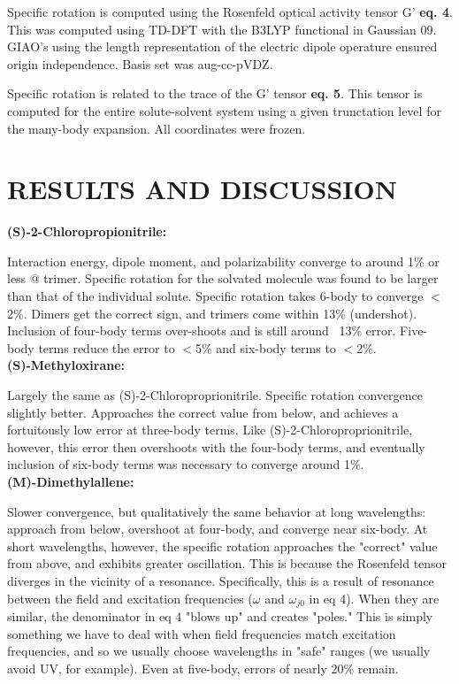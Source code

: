 \documentclass[12pt,a4paper]{article}
\begin{document}
	Specific rotation is computed using the Rosenfeld optical activity tensor G' \textbf{eq. 4}. This was computed using TD-DFT with the B3LYP functional in Gaussian 09. GIAO's using the length representation of the electric dipole operature ensured origin independence. Basis set was aug-cc-pVDZ.
	
	Specific rotation is related to the trace of the G' tensor \textbf{eq. 5}. This tensor is computed for the entire solute-solvent system using a given trunctation level for the many-body expansion. All coordinates were frozen.
	\section{RESULTS AND DISCUSSION}
	\noindent
	\textbf{(S)-2-Chloropropionitrile:} 
	
	Interaction energy, dipole moment, and polarizability converge to around 1\% or less @ trimer. Specific rotation for the solvated molecule was found to be larger than that of the individual solute. Specific rotation takes 6-body to converge $<$2\%. Dimers get the correct sign, and trimers come within 13\% (undershot). Inclusion of four-body terms over-shoots and is still around ~13\% error. Five-body terms reduce the error to $<$5\% and six-body terms to $<$2\%.\\

	\noindent
	\textbf{(S)-Methyloxirane:}
	
	Largely the same as (S)-2-Chloroproprionitrile. Specific rotation convergence slightly better. Approaches the correct value from below, and achieves a fortuitously low error at three-body terms. Like (S)-2-Chloroproprionitrile, however, this error then overshoots with the four-body terms, and eventually inclusion of six-body terms was necessary to converge around 1\%.\\
	
	\noindent
	\textbf{(M)-Dimethylallene:}
	
	Slower convergence, but qualitatively the same behavior at long wavelengths: approach from below, overshoot at four-body, and converge near six-body. At short wavelengths, however, the specific rotation approaches the "correct" value from above, and exhibits greater oscillation. This is because the Rosenfeld tensor diverges in the vicinity of a resonance. Specifically, this is a result of resonance between the field and excitation frequencies ($\omega$ and $\omega_{j0}$  in eq 4). When they are similar, the denominator in eq 4 "blows up" and creates "poles." This is simply something we have to deal with when field frequencies match excitation frequencies, and so we usually choose wavelengths in "safe" ranges (we usually avoid UV, for example). Even at five-body, errors of nearly 20\% remain. \\
	
\end{document}
